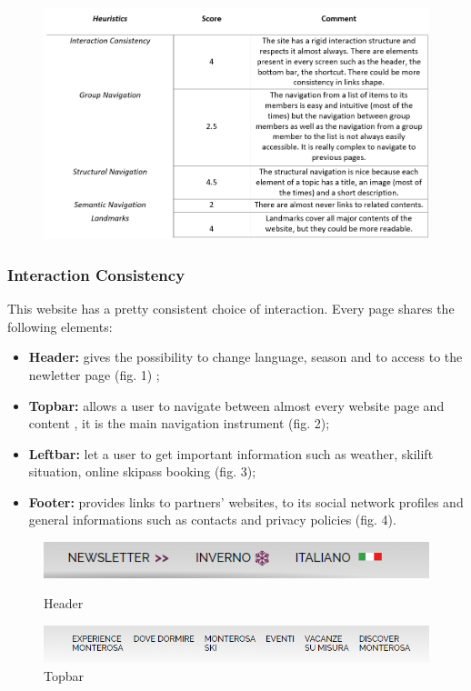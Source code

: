 \begin{figure}[h!]
	\centering
	\begin{minipage}[b]{1\textwidth}
    		\includegraphics[width=\textwidth]{./assets/navigation-final.PNG}
	\end{minipage}
\end{figure}
\FloatBarrier
\subsubsection{Interaction Consistency}
This website has a pretty consistent choice of interaction. Every page shares the following elements:
\begin{itemize}
	\item \textbf{Header:} gives the possibility to change language, season and to access to the newletter page (fig. 1) ;
	\item \textbf{Topbar:} allows a user to navigate between almost every website page and content , it is the main navigation 		instrument (fig. 2); 
	\item \textbf{Leftbar:} let a user to get important information such as weather, skilift 	situation, online skipass booking (fig. 		3);
	\item \textbf{Footer:} provides links to partners' websites, to its social network profiles and general informations such as 			contacts and privacy policies (fig. 4).
\end{itemize}  

\begin{figure}[h!]
	\centering
	\begin{minipage}[b]{0.7\textwidth}
    		\includegraphics[width=\textwidth]{./assets/Interaction-header.png}
		\caption{Header}
	\end{minipage}
	\hfill
	\centering
	\begin{minipage}[b]{0.7\textwidth}
    		\includegraphics[width=\textwidth]{./assets/Interaction-topbar.png}
		\caption{Topbar}
	\end{minipage}
\end{figure}
\FloatBarrier

